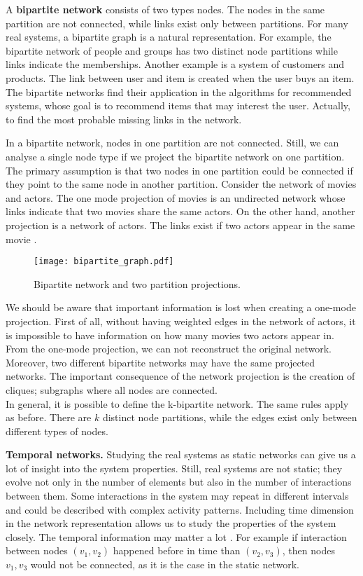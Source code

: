 A \textbf{bipartite network} consists of two types nodes. The nodes in the same partition are not connected, while links exist only between partitions. For many real systems, a bipartite graph is a natural representation\cite{barabasi2016network, latora2017complex}. For example, the bipartite network of people and groups has two distinct node partitions while links indicate the memberships. Another example is a system of customers and products. The link between user and item is created when the user buys an item. The bipartite networks find their application in the algorithms for recommended systems, whose goal is to recommend items that may interest the user. Actually, to find the most probable missing links in the network. 

In a bipartite network, nodes in one partition are not connected. Still, we can analyse a single node type if we project the bipartite network on one partition. The primary assumption is that two nodes in one partition could be connected if they point to the same node in another partition. Consider the network of movies and actors. The one mode projection of movies is an undirected network whose links indicate that two movies share the same actors. On the other hand, another projection is a network of actors. The links exist if two actors appear in the same movie \cite{newman2010, barabasi2016network}.

\begin{figure}[h]
	\centering
	\texttt{[image: bipartite\_graph.pdf]} 
	\caption[Bipartite network.]{Bipartite network and two partition projections.}
	\label{fig:gt2}
\end{figure}

We should be aware that important information is lost when creating a one-mode projection. First of all, without having weighted edges in the network of actors, it is impossible to have information on how many movies two actors appear in. From the one-mode projection, we can not reconstruct the original network. Moreover, two different bipartite networks may have the same projected networks. The important consequence of the network projection is the creation of cliques; subgraphs where all nodes are connected. \\
In general, it is possible to define the k-bipartite network. The same rules apply as before. There are $k$ distinct node partitions, while the edges exist only between different types of nodes.

\textbf{Temporal networks.}
Studying the real systems as static networks can give us a lot of insight into the system properties. Still, real systems are not static; they evolve not only in the number of elements but also in the number of interactions between them. Some interactions in the system may repeat in different intervals and could be described with complex activity patterns. Including time dimension in the network representation allows us to study the properties of the system closely. The temporal information may matter a lot \cite{holme2012}. For example if interaction between nodes $(v_1, v_2)$ happened before in time than  $(v_2, v_3)$, then nodes $v_1, v_3$ would not be connected, as it is the case in the static network. 

